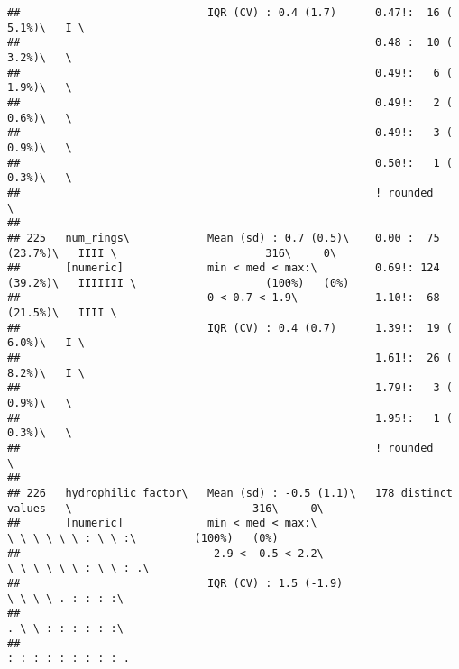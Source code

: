 \documentclass[]{article}
\begin{document}
\begin{verbatim}
##                             IQR (CV) : 0.4 (1.7)      0.47!:  16 ( 5.1%)\   I \                                            
##                                                       0.48 :  10 ( 3.2%)\   \                                              
##                                                       0.49!:   6 ( 1.9%)\   \                                              
##                                                       0.49!:   2 ( 0.6%)\   \                                              
##                                                       0.49!:   3 ( 0.9%)\   \                                              
##                                                       0.50!:   1 ( 0.3%)\   \                                              
##                                                       ! rounded             \                                              
## 
## 225   num_rings\            Mean (sd) : 0.7 (0.5)\    0.00 :  75 (23.7%)\   IIII \                       316\     0\       
##       [numeric]             min < med < max:\         0.69!: 124 (39.2%)\   IIIIIII \                    (100%)   (0%)     
##                             0 < 0.7 < 1.9\            1.10!:  68 (21.5%)\   IIII \                                         
##                             IQR (CV) : 0.4 (0.7)      1.39!:  19 ( 6.0%)\   I \                                            
##                                                       1.61!:  26 ( 8.2%)\   I \                                            
##                                                       1.79!:   3 ( 0.9%)\   \                                              
##                                                       1.95!:   1 ( 0.3%)\   \                                              
##                                                       ! rounded             \                                              
## 
## 226   hydrophilic_factor\   Mean (sd) : -0.5 (1.1)\   178 distinct values   \                            316\     0\       
##       [numeric]             min < med < max:\                               \ \ \ \ \ \ : \ \ :\         (100%)   (0%)     
##                             -2.9 < -0.5 < 2.2\                              \ \ \ \ \ \ : \ \ : .\                         
##                             IQR (CV) : 1.5 (-1.9)                           \ \ \ \ . : : : :\                             
##                                                                             . \ \ : : : : : :\                             
##                                                                             : : : : : : : : : .                            

\end{verbatim}
\end{document}
